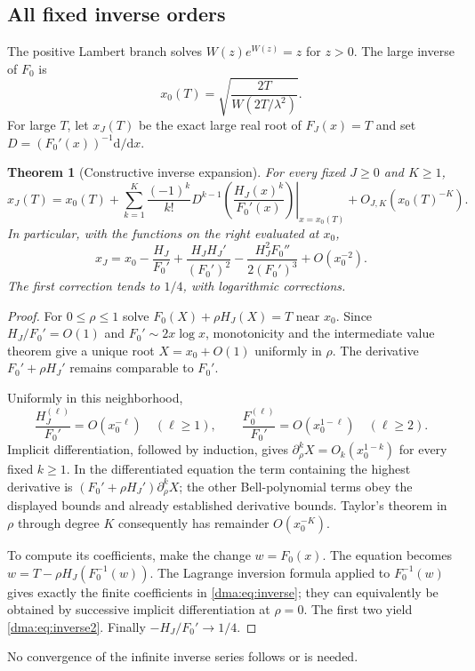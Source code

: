 \documentclass[11pt,letterpaper]{article}
\newtheorem{theorem}{Theorem}[section]
\theoremstyle{remark}\newtheorem{remark}[theorem]{Remark}
\newcommand{\dd}{\mathrm d}
\begin{document}
\subsection{All fixed inverse orders}
The positive Lambert branch solves $W(z)e^{W(z)}=z$ for $z>0$. The large inverse of $F_0$ is
\begin{equation}\label{dma:eq:x0}
 x_0(T)=\sqrt{\frac{2T}{W(2T/\lambda^2)}}.
\end{equation}
For large $T$, let $x_J(T)$ be the exact large real root of $F_J(x)=T$ and set
$D=(F_0'(x))^{-1}\dd/\dd x$.
\begin{theorem}[Constructive inverse expansion]\label{dma:thm:inverse}
For every fixed $J\geq0$ and $K\geq1$,
\begin{equation}\label{dma:eq:inverse}
 x_J(T)=x_0(T)+\sum_{k=1}^K\frac{(-1)^k}{k!}
 \left.D^{k-1}\left(\frac{H_J(x)^k}{F_0'(x)}\right)\right|_{x=x_0(T)}
 +O_{J,K}(x_0(T)^{-K}).
\end{equation}
In particular, with the functions on the right evaluated at $x_0$,
\begin{equation}\label{dma:eq:inverse2}
 x_J=x_0-\frac{H_J}{F_0'}+
 \frac{H_JH_J'}{(F_0')^2}-\frac{H_J^2F_0''}{2(F_0')^3}
 +O(x_0^{-2}).
\end{equation}
The first correction tends to $1/4$, with logarithmic corrections.
\end{theorem}
\begin{proof}
For $0\leq\rho\leq1$ solve $F_0(X)+\rho H_J(X)=T$ near $x_0$. Since $H_J/F_0'=O(1)$ and $F_0'\sim2x\log x$, monotonicity and the intermediate value theorem give a unique root $X=x_0+O(1)$ uniformly in $\rho$. The derivative $F_0'+\rho H_J'$ remains comparable to $F_0'$.

Uniformly in this neighborhood,
\[
 \frac{H_J^{(\ell)}}{F_0'}=O(x_0^{-\ell})\quad(\ell\geq1),\qquad
 \frac{F_0^{(\ell)}}{F_0'}=O(x_0^{1-\ell})\quad(\ell\geq2).
\]
Implicit differentiation, followed by induction, gives
$\partial_\rho^kX=O_k(x_0^{1-k})$ for every fixed $k\geq1$. In the differentiated equation the term containing the highest derivative is $(F_0'+\rho H_J')\partial_\rho^kX$; the other Bell-polynomial terms obey the displayed bounds and already established derivative bounds. Taylor's theorem in $\rho$ through degree $K$ consequently has remainder $O(x_0^{-K})$.

To compute its coefficients, make the change $w=F_0(x)$. The equation becomes $w=T-\rho H_J(F_0^{-1}(w))$. The Lagrange inversion formula applied to $F_0^{-1}(w)$ gives exactly the finite coefficients in \eqref{dma:eq:inverse}; they can equivalently be obtained by successive implicit differentiation at $\rho=0$. The first two yield \eqref{dma:eq:inverse2}. Finally $-H_J/F_0'\to1/4$.
\end{proof}
No convergence of the infinite inverse series follows or is needed.
\end{document}
